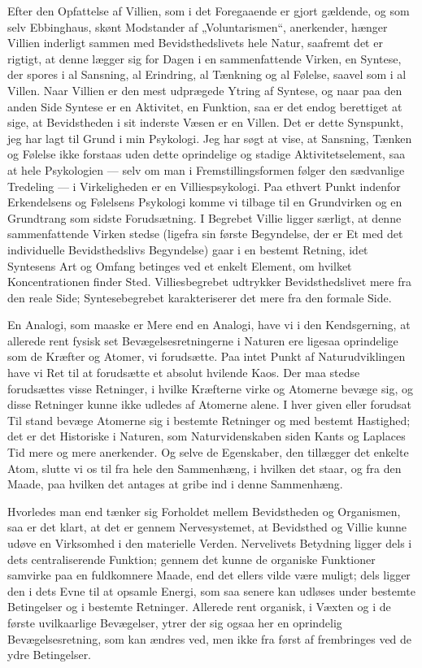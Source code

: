 \documentclass[12pt,a4paper,openany]{book}
\newcommand{\opage}[1]{\marginnote{\footnotesize\textit{[#1]}}}
\begin{document}
Efter den Opfattelse af Villien, som i det Foregaaende er
gjort gældende, og som selv Ebbinghaus, skønt Modstander af
„Voluntarismen“, anerkender, hænger Villien inderligt sammen
med Bevidsthedslivets hele Natur, saafremt det er rigtigt, at
denne lægger sig for Dagen i en sammenfattende Virken, en
Syntese, der spores i al Sansning, al Erindring, al Tænkning
og al Følelse, saavel som i al Villen. Naar Villien er den mest
udprægede Ytring af Syntese, og naar paa den anden Side
Syntese er en Aktivitet, en Funktion, saa er det endog berettiget
at sige, at Bevidstheden i sit inderste Væsen er en Villen.
Det er dette Synspunkt, jeg har lagt til Grund i min Psykologi.
Jeg har søgt at vise, at Sansning, Tænken og Følelse ikke forstaas
uden dette oprindelige og stadige Aktivitetselement, saa
at hele Psykologien --- selv om man i Fremstillingsformen
følger den sædvanlige Tredeling --- i Virkeligheden er en Villiespsykologi.
Paa ethvert Punkt indenfor Erkendelsens og Følelsens
Psykologi komme vi tilbage til en Grundvirken og en
Grundtrang som sidste Forudsætning. I Begrebet Villie ligger
særligt, at denne sammenfattende Virken stedse (ligefra sin
første Begyndelse, der er Et med det individuelle Bevidsthedslivs
Begyndelse) gaar i en bestemt Retning, idet Syntesens Art
og Omfang betinges ved et enkelt Element, om hvilket Koncentrationen
finder Sted. Villiesbegrebet udtrykker Bevidsthedslivet
mere fra den reale Side; Syntesebegrebet karakteriserer
det mere fra den formale Side.

En Analogi, som maaske er Mere end en Analogi, have
vi i den Kendsgerning, at allerede rent fysisk set Bevægelsesretningerne
i Naturen ere ligesaa oprindelige som de Kræfter
og Atomer, vi forudsætte. Paa intet Punkt af Naturudviklingen
have vi Ret til at forudsætte et absolut hvilende Kaos. Der
maa stedse forudsættes visse Retninger, i hvilke Kræfterne
virke og Atomerne bevæge sig, og disse Retninger kunne ikke
udledes af Atomerne alene. I hver given eller forudsat Til%
\setcounter{footnote}{0}%
\opage{33}stand bevæge Atomerne sig i bestemte Retninger og med bestemt
Hastighed; det er det Historiske i Naturen, som Naturvidenskaben
siden Kants og Laplaces Tid mere og mere anerkender.
Og selve de Egenskaber, den tillægger det enkelte
Atom, slutte vi os til fra hele den Sammenhæng, i hvilken
det staar, og fra den Maade, paa hvilken det antages at gribe
ind i denne Sammenhæng.

Hvorledes man end tænker sig Forholdet mellem Bevidstheden
og Organismen, saa er det klart, at det er gennem
Nervesystemet, at Bevidsthed og Villie kunne udøve en Virksomhed
i den materielle Verden. Nervelivets Betydning ligger
dels i dets centraliserende Funktion; gennem det kunne de
organiske Funktioner samvirke paa en fuldkomnere Maade, end
det ellers vilde være muligt; dels ligger den i dets Evne
til at opsamle Energi, som saa senere kan udløses under bestemte
Betingelser og i bestemte Retninger. Allerede rent
organisk, i Væxten og i de første uvilkaarlige Bevægelser,
ytrer der sig ogsaa her en oprindelig Bevægelsesretning, som
kan ændres ved, men ikke fra først af frembringes ved de
ydre Betingelser.
\end{document}
